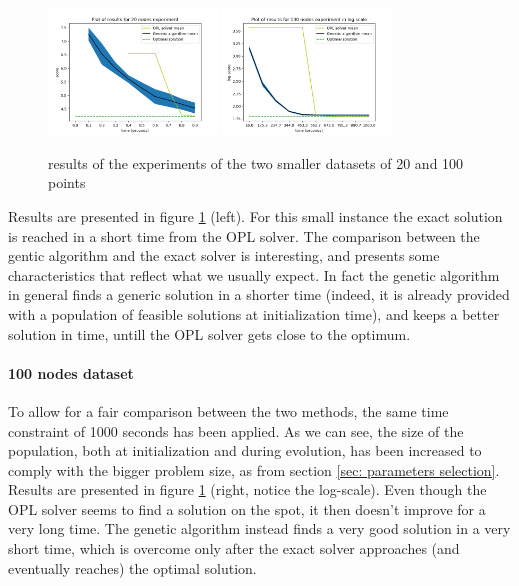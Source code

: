 \documentclass{article}
\begin{document}
\begin{figure}
    \centering
\includegraphics[width=0.4\textwidth]{pics/20_nodes_results.png}
\includegraphics[width=0.4\textwidth]{pics/100_nodes_results.png}
 \caption{results of the experiments of the two smaller datasets of 20 and 100 points}
\label{fig:20and100points}
\end{figure}


Results are presented in figure \ref{fig:20and100points} (left).
For this small instance the exact solution is reached in a short time from the OPL solver. The comparison between the gentic algorithm and the exact solver is interesting, and presents some characteristics that reflect what we usually expect. In fact the genetic algorithm in general finds a generic solution in a shorter time (indeed, it is already provided with a population of feasible solutions at initialization time), and keeps a better solution in time, untill the OPL solver gets close to the optimum.

\paragraph*{100 nodes dataset}
To allow for a fair comparison between the two methods, the same time constraint of 1000 seconds has been applied. As we can see, the size of the population, both at initialization and during evolution, has been increased to comply with the bigger problem size, as from section \ref{sec: parameters selection}. \\
Results are presented in figure \ref{fig:20and100points} (right, notice the log-scale). Even though the OPL solver seems to find a solution on the spot, it then doesn't improve for a very long time. The genetic algorithm instead finds a very good solution in a very short time, which is overcome only after the exact solver approaches (and eventually reaches) the optimal solution.
\end{document}

